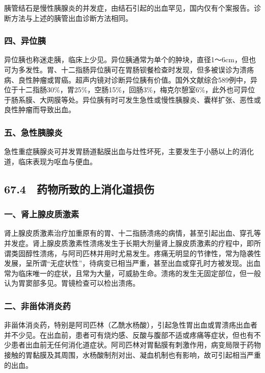 胰管结石是慢性胰腺炎的并发症，由结石引起的出血罕见，国内仅有个案报告。诊断方法与上述的胰管出血诊断方法相同。

\subsubsection{四、异位胰}

异位胰也称迷走胰，临床上少见。异位胰通常为单个的肿块，直径1～6cm，但也可为多发性。胃、十二指肠异位胰可在胃肠钡餐检查时发现，但多被误诊为溃疡病、良性肿瘤或胃癌。超声内镜对诊断异位胰有价值。国外文献综合589例中，异位于十二指肠30\%，胃25\%，空肠15\%，回肠3\%，梅克尔憩室6\%，此外也可异位于肠系膜、大网膜等处。异位胰有时可发生急性或慢性胰腺炎、囊样扩张、恶性或良性肿瘤而导致出血。

\subsubsection{五、急性胰腺炎}

急性重症胰腺炎可并发胃肠道黏膜出血与灶性坏死，主要发生于小肠以上的消化道，临床表现为呕血与便血。

\protect\hypertarget{text00170.html}{}{}

\subsection{67.4　药物所致的上消化道损伤}

\subsubsection{一、肾上腺皮质激素}

肾上腺皮质激素治疗加重原有的胃、十二指肠溃疡的病情，甚至引起出血、穿孔等并发症。肾上腺皮质激素性溃疡发生于长期大剂量肾上腺皮质激素的疗程中，即所谓类固醇性溃疡，与阿司匹林并用时尤易发生。疼痛无明显的节律性，常为隐袭性发展，呈所谓“无症状性”，待病变已相当严重，甚至出血或穿孔时方被发现。出血常为临床唯一的症状，且常为大量，可威胁生命。溃疡的发生无固定部位，但一般认为胃窦部多见。胃镜检查可以检出溃疡。

\subsubsection{二、非甾体消炎药}

非甾体消炎药，特别是阿司匹林（乙酰水杨酸），引起急性胃出血或胃溃疡出血者并不少见。在出血前，患者可有烧灼感、反酸与腹部不适或疼痛等症状，但也有不少患者出血前无任何消化道症状。阿司匹林对胃黏膜有刺激作用，病变局限于药物接触的胃黏膜及其周围，水杨酸制剂对出、凝血机制也有影响，故可引起相当严重的出血。


